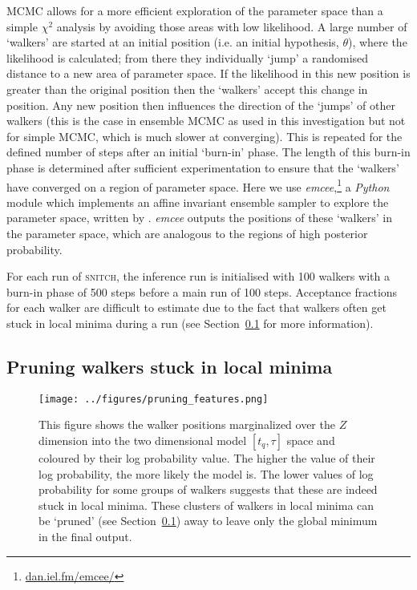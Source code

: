 \documentclass[useAMS,usenatbib]{mn2e}
\begin{document}
MCMC allows for a more efficient exploration of the parameter space than a simple $\chi^2$ analysis by avoiding those areas with low likelihood. A large number of `walkers' are started at an initial position (i.e. an initial hypothesis, $\theta$), where the likelihood is calculated; from there they individually `jump' a randomised distance to a new area of parameter space. If the likelihood in this new position is greater than the original position then the `walkers' accept this change in position. Any new position then influences the direction of the  `jumps' of other walkers (this is the case in ensemble MCMC as used in this investigation but not for simple MCMC, which is much slower at converging). This is repeated for the defined number of steps after an initial `burn-in' phase. The length of this burn-in phase is determined after sufficient experimentation to ensure that the `walkers' have converged on a region of parameter space. Here we use \emph{emcee},\footnote{\url{dan.iel.fm/emcee/}} a \emph{Python} module which implements an affine invariant ensemble sampler to explore the parameter space, written by \cite{emcee13}. \emph{emcee} outputs the positions of these `walkers' in the parameter space, which are analogous to the regions of high posterior probability. 

For each run of \textsc{snitch}, the inference run is initialised with 100 walkers with a burn-in phase of 500 steps before a main run of 100 steps. Acceptance fractions for each walker are difficult to estimate due to the fact that walkers often get stuck in local minima during a run (see Section~\ref{sec:pruning} for more information). 


\subsection{Pruning walkers stuck in local minima}\label{sec:pruning}

\begin{figure}
\centering
\texttt{[image: ../figures/pruning\_features.png]}
\caption{This figure shows the walker positions marginalized over the $Z$ dimension into the two dimensional model $[t_q, \tau]$ space and coloured by their log probability value. The higher the value of their log probability, the more likely the model is. The lower values of log probability for some groups of walkers suggests that these are indeed stuck in local minima. These clusters of walkers in local minima can be `pruned' (see Section~\ref{sec:pruning}) away to leave only the global minimum in the final output.}
\label{fig:localminima}
\end{figure}
\end{document}
